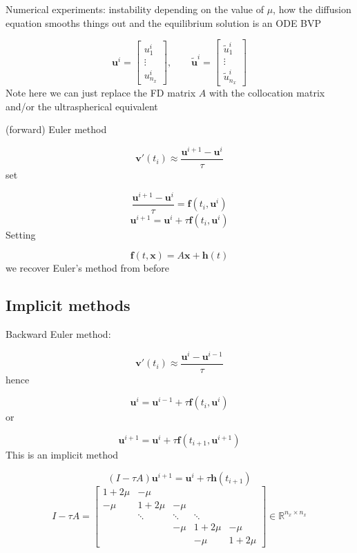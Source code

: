 \documentclass[12pt,a4paper]{article}
\begin{document}
Numerical experiments: instability depending on the value of $\mu$, how the diffusion equation smooths things out and the equilibrium solution is an ODE BVP

\[
\mathbf{u}^i = 
\begin{bmatrix}
u^i_{1} \\
\vdots \\
u^i_{n_x}
\end{bmatrix}, \qquad
\tilde{\mathbf{u}}^i = 
\begin{bmatrix}
\tilde{u}^i_{1} \\
\vdots \\
\tilde{u}^i_{n_x}
\end{bmatrix}
\]
Note here we can just replace the FD matrix $A$ with the collocation matrix and/or the ultraspherical equivalent

(forward) Euler method

\[
\mathbf{v}'(t_i) \approx \frac{\mathbf{u}^{i+1} - \mathbf{u}^{i}}{\tau}
\]
set

\[
\frac{\mathbf{u}^{i+1} - \mathbf{u}^{i}}{\tau} = \mathbf{f}(t_i,\mathbf{u}^{i})
\]
\[
\mathbf{u}^{i+1} = \mathbf{u}^{i} + \tau \mathbf{f}(t_i,\mathbf{u}^{i})
\]
Setting 

\[
\mathbf{f}(t,\mathbf{x}) = A\mathbf{x} + \mathbf{h}(t) 
\]
we recover Euler's method from before

\subsection{Implicit methods}
Backward Euler method:

\[
\mathbf{v}'(t_i) \approx \frac{\mathbf{u}^{i} - \mathbf{u}^{i-1}}{\tau}
\]
hence

\[
\mathbf{u}^{i} = \mathbf{u}^{i-1} + \tau\mathbf{f}(t_i,\mathbf{u}^{i})
\]
or

\[
\mathbf{u}^{i+1} = \mathbf{u}^{i} + \tau\mathbf{f}(t_{i+1},\mathbf{u}^{i+1})
\]
This is an implicit method

\[
\left( I - \tau A   \right)\mathbf{u}^{i+1}= \mathbf{u}^{i} + \tau\mathbf{h}(t_{i+1})
\]
\[
I - \tau A = \begin{bmatrix}
1 + 2\mu & -\mu & & & \\
-\mu  & 1+2\mu & -\mu  & & \\
      & \ddots & \ddots & \ddots & \\
      &        & -\mu    & 1+2\mu & -\mu \\
      &        &        & -\mu & 1+2\mu
\end{bmatrix}   \in \mathbb{R}^{n_x \times n_x}
\]
\end{document}

